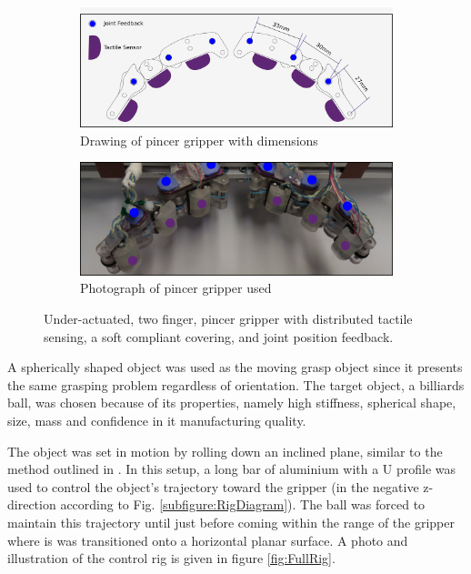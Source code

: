 \begin{figure}[ht]
    \centering
    \begin{subfigure}{.8\linewidth}
        \centering
        \includegraphics[width=\textwidth]{Images/Dimensions.png}
        \caption{Drawing of pincer gripper with dimensions}
        \label{subfig:1a}
    \end{subfigure}
    \begin{subfigure}{.8\linewidth}
        \centering
    \includegraphics[width=\textwidth]{Images/LabeledPhoto.png}
       \caption{Photograph of pincer gripper used}
        \label{subfig:1b}
    \end{subfigure}
 \caption{Under-actuated, two finger, pincer gripper with distributed tactile sensing, a soft compliant covering, and joint position feedback.}
\label{fig:Gripper}
\end{figure}

A spherically shaped object was used as the moving grasp object since it presents the same grasping problem regardless of orientation. The target object, a billiards ball, was chosen because of its properties, namely high stiffness, spherical shape, size, mass and confidence in it manufacturing quality.

The object was set in motion by rolling down an inclined plane, similar to the method outlined in \cite{DynamicObjectManipulation}. In this setup, a long bar of aluminium with a U profile was used to control the object's trajectory toward the gripper (in the negative z-direction according to Fig. \ref{subfigure:RigDiagram}). The ball was forced to maintain this trajectory until just before coming within the range of the gripper where is was  transitioned onto a horizontal planar surface. A photo and illustration of the control rig is given in figure \ref{fig:FullRig}. 

